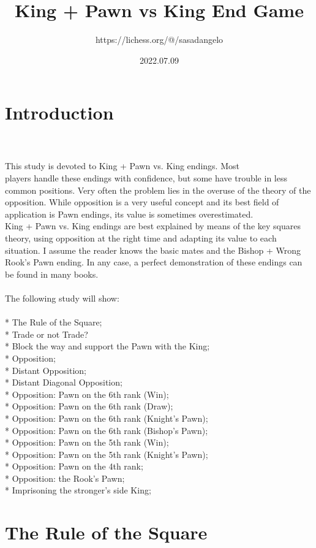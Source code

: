 \documentclass{article}
\title{King + Pawn vs King End Game}
\author{https://lichess.org/@/sasadangelo}
\date{2022.07.09}
\begin{document}
\begin{titlepage}
\maketitle
\end{titlepage}
\section{ Introduction}

\\
\\
This study is devoted to King + Pawn vs. King endings. Most\\players handle these endings with confidence, but some have trouble in less common positions. Very often the problem lies in the overuse of the theory of the opposition. While opposition is a very useful concept and its best field of application is Pawn endings, its value is sometimes overestimated.\\King + Pawn vs. King endings are best explained by means of the key squares\\theory, using opposition at the right time and adapting its value to each situation. I assume the reader knows the basic mates and the Bishop + Wrong Rook's Pawn ending. In any case, a perfect demonstration of these endings can be found in many books.\\\\The following study will show:\\\\* The Rule of the Square;\\* Trade or not Trade?\\* Block the way and support the Pawn with the King;\\* Opposition;\\* Distant Opposition;\\* Distant Diagonal Opposition;\\* Opposition: Pawn on the 6th rank (Win);\\* Opposition: Pawn on the 6th rank (Draw);\\* Opposition: Pawn on the 6th rank (Knight's Pawn);\\* Opposition: Pawn on the 6th rank (Bishop's Pawn);\\* Opposition: Pawn on the 5th rank (Win);\\* Opposition: Pawn on the 5th rank (Knight's Pawn);\\* Opposition: Pawn on the 4th rank;\\* Opposition: the Rook's Pawn;\\* Imprisoning the stronger's side King;\section{ The Rule of the Square}
\end{document}
